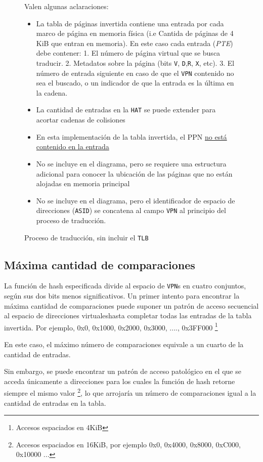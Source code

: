 \documentclass{article}
\begin{document}
\begin{figure}[!ht]
\begin{tikzpicture}[x=0.75pt,y=0.75pt,yscale=-1,xscale=1]
\end{tikzpicture}
Valen algunas aclaraciones:
\begin{itemize}
\item La tabla de páginas invertida contiene una entrada por cada marco de página en memoria física (i.e Cantida de páginas de 4 KiB que entran en memoria). En este caso cada entrada (\textit{PTE}) debe contener: 1. El número de página virtual que se busca traducir. 2. Metadatos sobre la página (bits \texttt{V}, \texttt{D},\texttt{R}, \texttt{X}, etc). 3. El número de entrada siguiente en caso de que el \texttt{VPN} contenido no sea el buscado, o un indicador de que la entrada es la última en la cadena.
\item La cantidad de entradas en la \texttt{HAT} se puede extender para acortar cadenas de colisiones
\item En esta implementación de la tabla invertida, el PPN \underline{no está contenido en la entrada}
\item No se incluye en el diagrama, pero se requiere una estructura adicional para conocer la ubicación de las páginas que no están alojadas en memoria principal
\item No se incluye en el diagrama, pero el identificador de espacio de direcciones (\texttt{ASID}) se concatena al campo \texttt{VPN} al principio del proceso de traducción.  
\end{itemize}

\caption{\label{ref::trad-no-tlb} Proceso de traducción, sin incluir el \texttt{TLB}}
\end{figure}


\subsection{Máxima cantidad de comparaciones}
La función de hash especificada divide al espacio de \texttt{VPN}s en cuatro conjuntos, según sus dos bits menos significativos. Un primer intento para encontrar la máxima cantidad de comparaciones puede suponer un patrón de acceso secuencial al espacio de direcciones virtualeshasta completar todas las entradas de la tabla invertida. 
Por ejemplo, 
0x0, 0x1000, 0x2000, 0x3000, ...., 0x3FF000 \footnote{Accesos espaciados en 4KiB}

En este caso, el máximo número de comparaciones equivale a un cuarto de la cantidad de entradas.

Sin embargo, se puede encontrar un patrón de acceso patológico en el que se acceda únicamente a direcciones para los cuales la función de hash retorne siempre el mismo valor \footnote {Accesos espaciados en 16KiB, por ejemplo 0x0, 0x4000, 0x8000, 0xC000, 0x10000 ... }, lo que arrojaría un número de comparaciones igual a la cantidad de entradas en la tabla.
\end{document}
